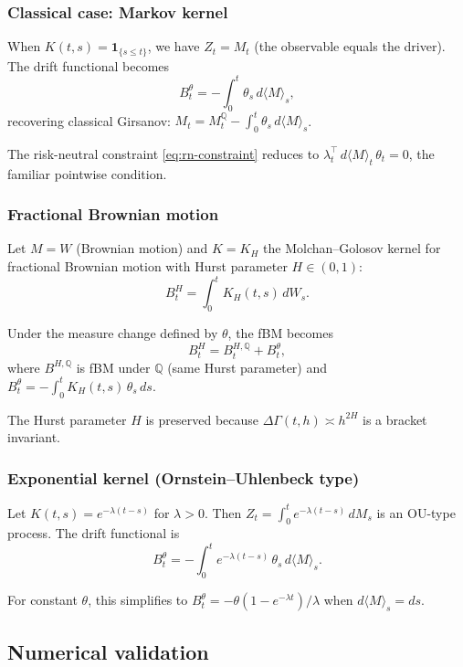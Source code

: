 \documentclass[11pt]{article}
\theoremstyle{plain}
\theoremstyle{definition}
\theoremstyle{remark}
\newcommand{\QQ}{\mathbb{Q}}
\newcommand{\dGamma}{\Delta\Gamma}
\newcommand{\bracket}[1]{\langle #1 \rangle}
\begin{document}
\subsubsection{Classical case: Markov kernel}

When $K(t,s) = \mathbf{1}_{\{s \le t\}}$, we have $Z_t = M_t$ (the observable
equals the driver). The drift functional becomes
\[
B_t^\theta = -\int_0^t \theta_s\,d\bracket{M}_s,
\]
recovering classical Girsanov: $M_t = M_t^{\QQ} - \int_0^t \theta_s\,d\bracket{M}_s$.

The risk-neutral constraint \eqref{eq:rn-constraint} reduces to
$\lambda_t^\top\,d\bracket{M}_t\,\theta_t = 0$, the familiar pointwise condition.

\subsubsection{Fractional Brownian motion}

Let $M = W$ (Brownian motion) and $K = K_H$ the Molchan--Golosov kernel for
fractional Brownian motion with Hurst parameter $H \in (0,1)$:
\[
B_t^H = \int_0^t K_H(t,s)\,dW_s.
\]

Under the measure change defined by $\theta$, the fBM becomes
\[
B_t^H = B_t^{H,\QQ} + B_t^\theta,
\]
where $B^{H,\QQ}$ is fBM under $\QQ$ (same Hurst parameter) and
$B_t^\theta = -\int_0^t K_H(t,s)\,\theta_s\,ds$.

The Hurst parameter $H$ is preserved because $\dGamma(t,h) \asymp h^{2H}$ is
a bracket invariant.

\subsubsection{Exponential kernel (Ornstein--Uhlenbeck type)}

Let $K(t,s) = e^{-\lambda(t-s)}$ for $\lambda > 0$. Then
$Z_t = \int_0^t e^{-\lambda(t-s)}\,dM_s$ is an OU-type process. The drift
functional is
\[
B_t^\theta = -\int_0^t e^{-\lambda(t-s)}\,\theta_s\,d\bracket{M}_s.
\]

For constant $\theta$, this simplifies to $B_t^\theta = -\theta(1 - e^{-\lambda t})/\lambda$
when $d\bracket{M}_s = ds$.

\subsection{Numerical validation}
\end{document}
